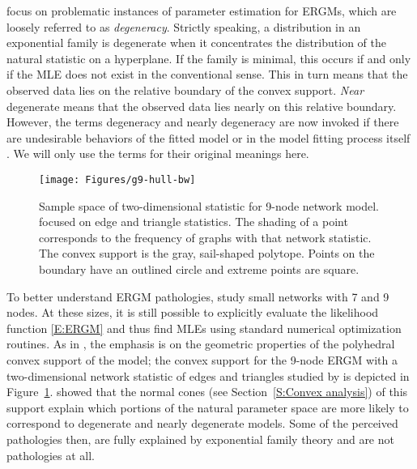 \citet*{Handcock:degeneracy, Rinaldo:2009} focus on problematic instances of parameter 
estimation for ERGMs, which are loosely referred 
to as \emph{degeneracy}.  Strictly speaking, a distribution in an exponential
family is degenerate when it concentrates the distribution of the natural statistic
on a hyperplane.  If the family is minimal, this occurs if and only if the MLE does not exist in the conventional sense.  This in turn means that the observed
data lies on the relative boundary of the convex support.  \emph{Near} degenerate  
means that the observed data lies nearly on this relative boundary.
However, the terms degeneracy and nearly degeneracy
are now invoked if there are undesirable behaviors of the fitted model or 
in the model fitting process itself
\citep{Handcock:degeneracy,advancesp*,recentp*,statnet-tutorial}.
We will only use the terms for their original meanings here.   

\begin{figure}[h!]
\centering
\texttt{[image: Figures/g9-hull-bw]}
\caption[Sample space of two-dimensional statistic for 9-node network model]{Sample space 
of two-dimensional statistic for 9-node network model.  \citet{Rinaldo:2009} focused
on edge and triangle statistics.  The shading of a point corresponds to 
the frequency of graphs with that network statistic.  
The convex support is the gray, sail-shaped polytope.  Points on the 
boundary have an outlined circle and extreme points are square.}
\label{F:g9-hull}
\end{figure}

To better understand ERGM pathologies, \citeauthor{Handcock:degeneracy,Rinaldo:2009}
study small networks with 7 and 9 nodes.  At these sizes, it is still 
possible to explicitly evaluate the likelihood function \eqref{E:ERGM} and thus 
find MLEs using standard numerical optimization routines.  
As in \citep{Geyer:gdor}, the emphasis is on the geometric properties of the 
polyhedral convex support of the model;
the convex support for the 9-node ERGM with a two-dimensional network statistic of
edges and triangles
studied by \citeauthor{Rinaldo:2009} is depicted in Figure~\ref{F:g9-hull}.
\citeauthor{Rinaldo:2009} showed that the normal cones (see Section~\ref{S:Convex analysis}) of this support
explain which portions of the natural parameter space are more likely to correspond to 
degenerate and nearly degenerate models.  Some of the perceived pathologies then, 
are fully explained by exponential family theory and are not pathologies at all.

